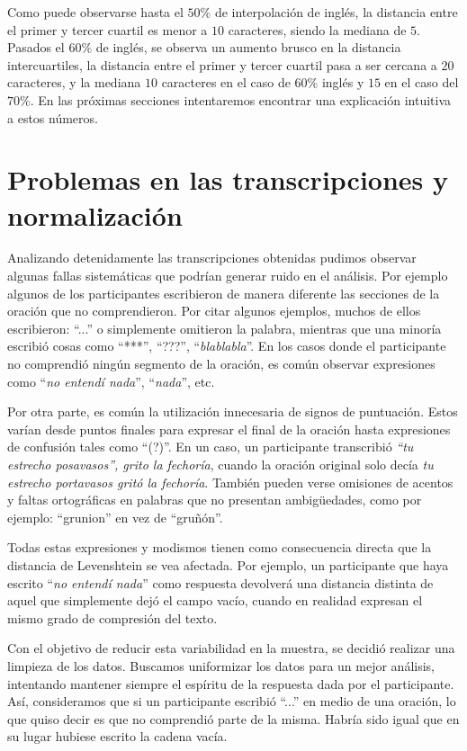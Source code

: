 Como puede observarse hasta el $50\%$ de interpolación de inglés, la distancia entre el primer y tercer cuartil es menor a $10$ caracteres, siendo la mediana de $5$. Pasados el $60\%$ de inglés, se observa un aumento brusco en la distancia intercuartiles, la distancia entre el primer y tercer cuartil pasa a ser cercana a $20$ caracteres, y la mediana $10$ caracteres en el caso de $60\%$ inglés y $15$ en el caso del $70\%$. En las próximas secciones intentaremos encontrar una explicación intuitiva a estos números.

\section{Problemas en las transcripciones y normalización}

Analizando detenidamente las transcripciones obtenidas pudimos observar algunas fallas sistemáticas que podrían generar ruido en el análisis. Por ejemplo algunos de los participantes escribieron de manera diferente las secciones de la oración que no comprendieron. Por citar algunos ejemplos, muchos de ellos escribieron: ``...'' o simplemente omitieron la palabra, mientras que una minoría escribió cosas como ``***'', ``???'', ``\textit{blablabla}''. En los casos donde el participante no comprendió ningún segmento de la oración, es común observar expresiones como ``\textit{no entendí nada}'', ``\textit{nada}'', etc.

Por otra parte, es común la utilización innecesaria de signos de puntuación. Estos varían desde puntos finales para expresar el final de la oración hasta expresiones de confusión tales como ``(?)''. En un caso, un participante transcribió \textit{``tu estrecho posavasos'', grito la fechoría}, cuando la oración original solo decía \textit{tu estrecho portavasos gritó la fechoría}.
También pueden verse omisiones de acentos y faltas ortográficas en palabras que no presentan ambigüedades, como por ejemplo: ``grunion'' en vez de ``gruñón''.

Todas estas expresiones y modismos tienen como consecuencia directa que la distancia de Levenshtein se vea afectada. Por ejemplo, un participante que haya escrito ``\textit{no entendí nada}'' como respuesta devolverá una distancia distinta de aquel que simplemente dejó el campo vacío, cuando en realidad expresan el mismo grado de compresión del texto.

Con el objetivo de reducir esta variabilidad en la muestra, se decidió realizar una limpieza de los datos. Buscamos uniformizar los datos para un mejor análisis, intentando mantener siempre el espíritu de la respuesta dada por el participante. Así, consideramos que si un participante escribió ``...'' en medio de una oración, lo que quiso decir es que no comprendió parte de la misma. Habría sido igual que en su lugar hubiese escrito la cadena vacía.

